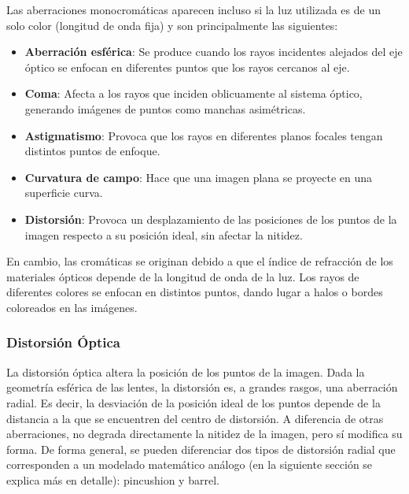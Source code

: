 \documentclass[12pt]{article}
\numberwithin{equation}{section}%
\newcommand{\lightit}[1]{{\lightitfont #1}}
\begin{document}
Las aberraciones monocromáticas aparecen incluso si la luz utilizada es de un solo color (longitud de onda fija) y son principalmente las siguientes:

\begin{itemize}
\item \textbf{Aberración esférica}: Se produce cuando los rayos incidentes alejados del eje óptico se enfocan en diferentes puntos que los rayos cercanos al eje.
\item \textbf{Coma}: Afecta a los rayos que inciden oblicuamente al sistema óptico, generando imágenes de puntos como manchas asimétricas.
\item \textbf{Astigmatismo}: Provoca que los rayos en diferentes planos focales tengan distintos puntos de enfoque.
\item \textbf{Curvatura de campo}: Hace que una imagen plana se proyecte en una superficie curva.
\item \textbf{Distorsión}: Provoca un desplazamiento de las posiciones de los puntos de la imagen respecto a su posición ideal, sin afectar la nitidez.
\end{itemize}

En cambio, las cromáticas se originan debido a que el índice de refracción de los materiales ópticos depende de la longitud de onda de la luz. Los rayos de diferentes colores se enfocan en distintos puntos, dando lugar a halos o bordes coloreados en las imágenes.

\subsubsection{Distorsión Óptica}

La distorsión óptica altera la posición de los puntos de la imagen. Dada  la geometría esférica de las lentes, la distorsión es, a grandes rasgos, una aberración radial. Es decir, la desviación de la posición ideal de los puntos depende de la distancia a la que se encuentren del centro de distorsión. A diferencia de otras aberraciones, no degrada directamente la nitidez de la imagen, pero sí modifica su forma. De forma general, se pueden diferenciar dos tipos de distorsión radial que corresponden a un modelado matemático análogo (en la siguiente sección se explica más en detalle): \lightit{pincushion} y \lightit{barrel}. 
\end{document}
